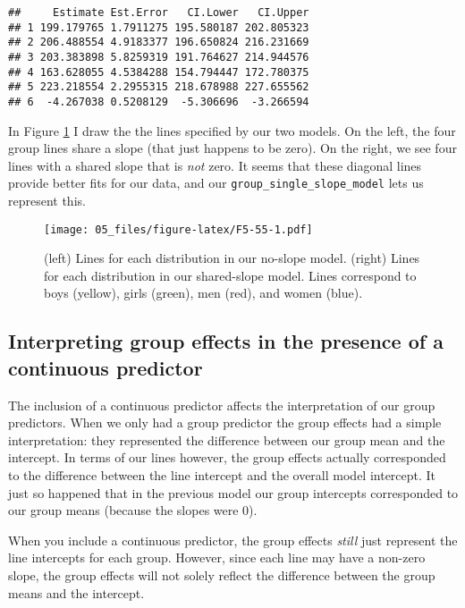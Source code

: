 \documentclass[
]{book}
\begin{document}
\begin{verbatim}
##     Estimate Est.Error   CI.Lower   CI.Upper
## 1 199.179765 1.7911275 195.580187 202.805323
## 2 206.488554 4.9183377 196.650824 216.231669
## 3 203.383898 5.8259319 191.764627 214.944576
## 4 163.628055 4.5384288 154.794447 172.780375
## 5 223.218554 2.2955315 218.678988 227.655562
## 6  -4.267038 0.5208129  -5.306696  -3.266594
\end{verbatim}

In Figure \ref{fig:F5-55} I draw the the lines specified by our two models. On the left, the four group lines share a slope (that just happens to be zero). On the right, we see four lines with a shared slope that is \emph{not} zero. It seems that these diagonal lines provide better fits for our data, and our \texttt{group\_single\_slope\_model} lets us represent this.

\begin{figure}
\centering
\texttt{[image: 05\_files/figure-latex/F5-55-1.pdf]}
\caption{\label{fig:F5-55}(left) Lines for each distribution in our no-slope model. (right) Lines for each distribution in our shared-slope model. Lines correspond to boys (yellow), girls (green), men (red), and women (blue).}
\end{figure}

\hypertarget{interpreting-group-effects-in-the-presence-of-a-continuous-predictor}{%
\subsection{Interpreting group effects in the presence of a continuous predictor}\label{interpreting-group-effects-in-the-presence-of-a-continuous-predictor}}

The inclusion of a continuous predictor affects the interpretation of our group predictors. When we only had a group predictor the group effects had a simple interpretation: they represented the difference between our group mean and the intercept. In terms of our lines however, the group effects actually corresponded to the difference between the line intercept and the overall model intercept. It just so happened that in the previous model our group intercepts corresponded to our group means (because the slopes were 0).

When you include a continuous predictor, the group effects \emph{still} just represent the line intercepts for each group. However, since each line may have a non-zero slope, the group effects will not solely reflect the difference between the group means and the intercept.
\end{document}
